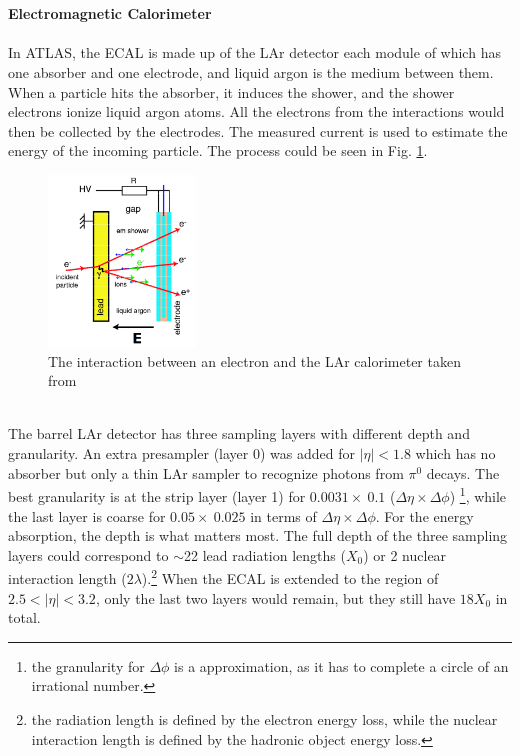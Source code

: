 \\
\\{\bf Electromagnetic Calorimeter}
\\
\\In ATLAS, the ECAL is made up of the LAr detector\cite{ATLAS:1996ab} each module of which has one absorber and one electrode, and liquid argon is the medium between them. When a particle hits the absorber, it induces the shower, and the shower electrons ionize liquid argon atoms. All the electrons from the interactions would then be collected by the electrodes. The measured current is used to estimate the energy of the incoming particle. The process could be seen in Fig. \ref{Fig:larshower}.\\
\begin{figure}[!h]                
	\includegraphics[width=0.35\textwidth]{Chapter2/LArshower}
	\centering
	\begin{center}
		\caption{The interaction between an electron and the LAr calorimeter taken from \cite{LArwork}}
		\label{Fig:larshower}            
	\end{center}
\end{figure}
\\The barrel LAr detector has three sampling layers with different depth and granularity. An extra presampler (layer 0) was added for $|\eta|<1.8$ which has no absorber but only a thin LAr sampler to recognize photons from $\pi^{0}$ decays. The best granularity is at the strip layer (layer 1) for $0.0031\times ~0.1$ ($\Delta \eta \times \Delta \phi$) \footnote{the granularity for $\Delta \phi$ is a approximation, as it has to complete a circle of an irrational number.}, while the last layer is coarse for $0.05 \times ~0.025$ in terms of $\Delta \eta \times \Delta \phi$. For the energy absorption, the depth is what matters most. The full depth of the three sampling layers could correspond to $\sim$22 lead radiation lengths ($X_{0}$) or 2 nuclear interaction length ($2\lambda$).\footnote{the radiation length is defined by the electron energy loss, while the nuclear interaction length is defined by the hadronic object energy loss.} When the ECAL is extended to the region of $2.5<|\eta|<3.2$, only the last two layers would remain, but they still have $18X_{0}$ in total.
